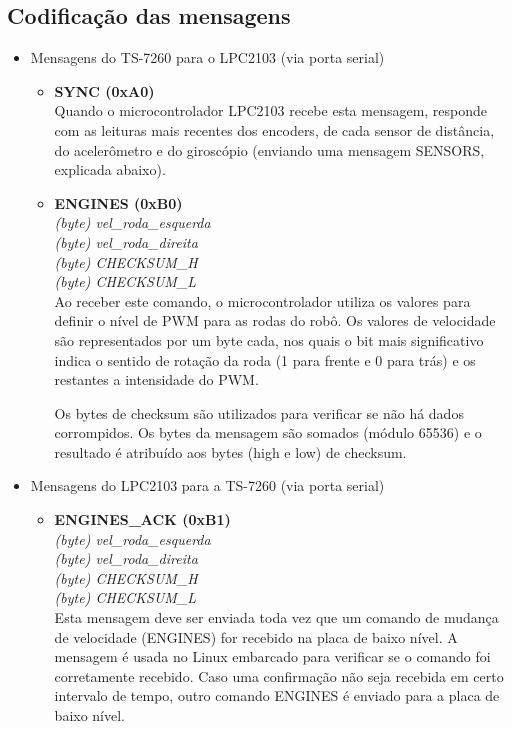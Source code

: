 \subsection{Codificação das mensagens}
\label{sec:codificacao_mensagens}

\begin{itemize}
  \item Mensagens do TS-7260 para o LPC2103 (via porta serial)
    	
	\begin{itemize}
		
	  \item \textbf{SYNC (0xA0)}\\
	  Quando o microcontrolador LPC2103 recebe esta mensagem, responde com as leituras mais recentes dos encoders, de cada sensor de distância, do acelerômetro e do giroscópio (enviando uma mensagem SENSORS, explicada abaixo).
	  
	  \item \textbf{ENGINES (0xB0)}\\
	  \textit{(byte) vel\_roda\_esquerda}\\
	  \textit{(byte) vel\_roda\_direita}\\
	  \textit{(byte) CHECKSUM\_H}\\
	  \textit{(byte) CHECKSUM\_L}\\
	  Ao receber este comando, o microcontrolador utiliza os valores para definir o nível de PWM para as rodas do robô. Os valores de velocidade são representados por um byte cada, nos quais o bit mais significativo indica o sentido de rotação da roda (1 para frente e 0 para trás) e os restantes a intensidade do PWM.
	  
	  Os bytes de checksum são utilizados para verificar se não há dados corrompidos. Os bytes da mensagem são somados (módulo 65536) e o resultado é atribuído aos bytes (high e low) de checksum.
	  \end{itemize}
	  
	  \item Mensagens do LPC2103 para a TS-7260 (via porta serial)
	  
	  \begin{itemize}

	  \item \textbf{ENGINES\_ACK (0xB1)}\\
	  \textit{(byte) vel\_roda\_esquerda}\\
	  \textit{(byte) vel\_roda\_direita}\\
	  \textit{(byte) CHECKSUM\_H}\\
	  \textit{(byte) CHECKSUM\_L}\\
	  Esta mensagem deve ser enviada toda vez que um comando de mudança de velocidade (ENGINES) for recebido na placa de baixo nível. A mensagem é usada no Linux embarcado para verificar se o comando foi corretamente recebido. Caso uma confirmação não seja recebida em certo intervalo de tempo, outro comando ENGINES é enviado para a placa de baixo nível.
	 

\end{itemize}
\end{itemize}
